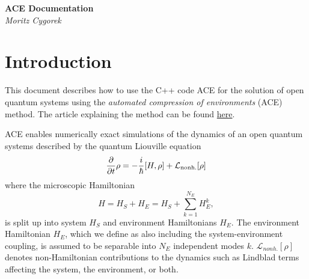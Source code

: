 \documentclass{scrartcl}
\begin{document}
\begin{center}
\textbf{\LARGE ACE Documentation}\\[2mm]
\textit{\Large Moritz Cygorek}
\end{center}
\section{Introduction}
This document describes how to use the C++ code ACE
for the solution of open quantum systems using the 
\emph{automated compression of environments} (ACE) method.
The article explaining the method can be found 
\href{https://arxiv.org/abs/2101.01653}{here}.

ACE enables numerically exact simulations of the dynamics of 
an open quantum systems described by the quantum Liouville equation
\begin{equation}
\frac{\partial}{\partial t} \rho=-\frac i\hbar [ H , \rho ] 
+\mathcal{L}_\textnormal{nonh.}[\rho]
\end{equation}
where the microscopic Hamiltonian 
\begin{equation}
H=H_S+H_E = H_S +\sum_{k=1}^{N_E} H_E^k,
\end{equation}
is split up into system $H_S$ and environment Hamiltonians $H_E$.
The environment Hamiltonian $H_E$, 
which we define as also including the system-environment coupling, 
is assumed to be separable into $N_E$ independent modes $k$. 
$\mathcal{L}_{nonh.}[\rho]$ denotes non-Hamiltonian contributions
to the dynamics such as Lindblad terms affecting the system, the environment,
or both.
\end{document}
